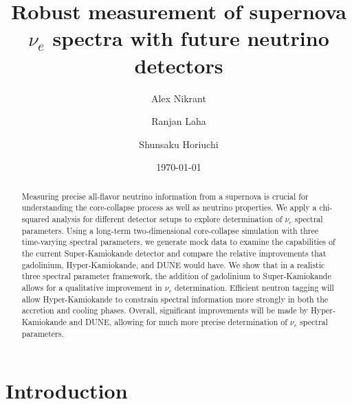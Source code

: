 \documentclass[aps,reprint,superscriptaddress]{revtex4-1}
\begin{document}
\title{Robust measurement of supernova $\nu_e$ spectra with future neutrino detectors}
\author{Alex Nikrant}
\author{Ranjan Laha}
\author{Shunsaku Horiuchi}
\date{\today}

\begin{abstract}
Measuring precise all-flavor neutrino information from a supernova is crucial for understanding the core-collapse process as well as neutrino properties. We apply a chi-squared analysis for different detector setups to explore determination of $\nu_{e}$ spectral parameters.  Using a long-term two-dimensional core-collapse simulation with three time-varying spectral parameters, we generate mock data to examine the capabilities of the current Super-Kamiokande detector and compare the relative improvements that gadolinium, Hyper-Kamiokande, and DUNE would have. We show that in a realistic three spectral parameter framework, the addition of gadolinium to Super-Kamiokande allows for a qualitative improvement in $\nu_e$ determination. Efficient neutron tagging will allow Hyper-Kamiokande to constrain spectral information more strongly in both the accretion and cooling phases. Overall, significant improvements will be made by Hyper-Kamiokande and DUNE, allowing for much more precise determination of $\nu_e$ spectral parameters.
\end{abstract}

\maketitle

\section{Introduction}
\end{document}
